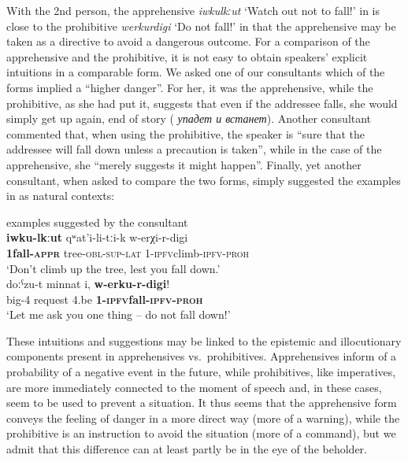 \documentclass[output=paper,colorlinks,citecolor=brown]{langscibook}
\begin{document}
 With the 2nd person, the apprehensive \textit{iwkulkːut} `Watch out not to fall!' in  is close to the prohibitive \textit{werkurdigi} `Do not fall!' in that the apprehensive may be taken as a directive to avoid a dangerous outcome. For a comparison of the apprehensive and the prohibitive, it is not easy to obtain speakers' explicit intuitions in a comparable form. We asked one of our consultants which of the forms implied a ``higher danger''. For her, it was the apprehensive, while the prohibitive, as she had put it, suggests that even if the addressee falls, she would simply get up again, end of story ( \textit{упадет и встанет}). Another consultant commented that, when using the prohibitive, the speaker is ``sure that the addressee will fall down unless a precaution is taken'', while in the case of the apprehensive, she ``merely suggests it might happen''. Finally, yet another consultant, when asked to compare the two forms, simply suggested the examples in  as natural contexts:



\ea \label{ex:DD6} \textnormal{examples suggested by the consultant} \\
\ea \label{ex:DD6a}
\gll \textbf{i{\textlangle}w{\textrangle}ku-lkːut} qʷat'i-li-tːi-k w-e{\textlangle}r{\textrangle}χi-r-digi \\
\textbf{{\textlangle}1{\textrangle}fall-\textsc{appr}} tree-\textsc{obl-sup-lat} 1-{\textlangle}\textsc{ipfv}{\textrangle}climb-\textsc{ipfv-proh} \\
\glt `Don't climb up the tree, lest you fall down.' \\
\ex \label{ex:DD6b}
\gll doːˁzu-t minnat i, \textbf{ w-e{\textlangle}r{\textrangle}ku-r-digi}! \\
big-4 request 4.be \textbf{ 1-{\textlangle}\textsc{ipfv}{\textrangle}fall-\textsc{ipfv-proh}} \\
\glt `Let me ask you one thing -- do not fall down!'
\z
\z


 These intuitions and suggestions may be linked to the epistemic and illocutionary components present in apprehensives vs.\ prohibitives. Apprehensives inform of a probability of a negative event in the future, while prohibitives, like imperatives, are more immediately connected to the moment of speech and, in these cases, seem to be used to prevent a situation. It thus seems that the apprehensive form conveys the feeling of danger in a more direct way (more of a warning), while the prohibitive is an instruction to avoid the situation (more of a command), but we admit that this difference can at least partly be in the eye of the beholder. 
\end{document}
